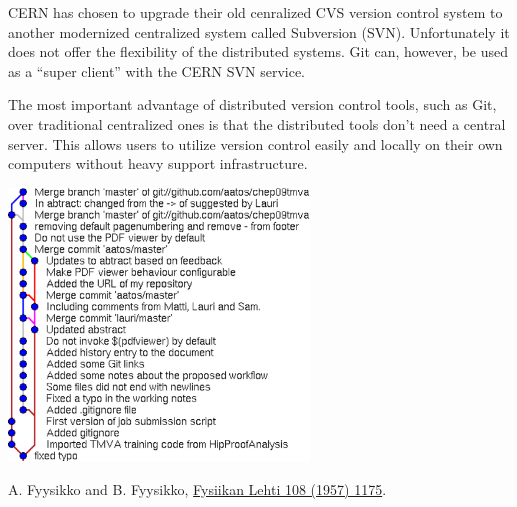 \documentclass[12pt]{article}
\begin{document}
\begin{minipage}{6cm}
CERN has chosen to upgrade their old cenralized CVS version control
system to another modernized centralized system called Subversion
(SVN). Unfortunately it does not offer the flexibility of the
distributed systems. Git can, however, be used as a ``super client''
with the CERN SVN service.

The most important advantage of distributed version control tools,
such as Git, over traditional centralized ones is that the distributed
tools don't need a central server. This allows users to utilize
version control easily and locally on their own computers without
heavy support infrastructure.
\end{minipage}
 \hfill
 \begin{minipage}{8cm}
\includegraphics[width=8cm]{gitk.eps} \end{minipage}


\begin{thebibliography}{9}

A. Fyysikko and B. Fyysikko,
\href{http://link.aps.org/abstract/PR/v108/p1175}{Fysiikan Lehti 108
(1957) 1175}.
\end{thebibliography}
\end{document}
